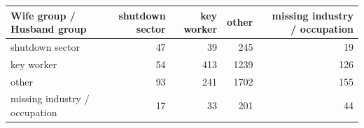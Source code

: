 
\begin{tabular}{lrrrr}
\toprule
Wife group / Husband group & shutdown sector & key worker & other & missing industry / occupation\\
\midrule
shutdown sector & 47 & 39 & 245 & 19\\
key worker & 54 & 413 & 1239 & 126\\
other & 93 & 241 & 1702 & 155\\
missing industry / occupation & 17 & 33 & 201 & 44\\
\bottomrule
\end{tabular}
